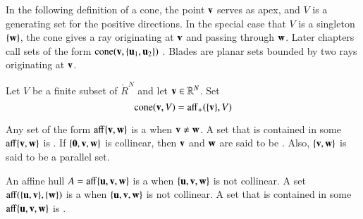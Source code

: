 In the following definition of a cone, the point ${\mathbf v}$ serves as apex,
and $V$ is a generating set for the positive directions.  In the
special case that $V$ is a singleton $\{{\mathbf w}\}$, the cone gives a ray
originating at ${\mathbf v}$ and passing through ${\mathbf w}$.  Later chapters call
sets of the form ${\operatorname{cone}}({\mathbf v},\{{\mathbf u}_1,{\mathbf u}_2\})$ .
Blades are planar sets bounded by two rays originating at ${\mathbf v}$.
%
%
%

\begin{definition}[cone]
Let $V$ be a finite subset of
$\ring{R}^N$ and let ${\mathbf v}\in\mathbb{R}^N$. Set
\[ 
{\operatorname{cone}}({\mathbf v},V) = {\operatorname{aff}}_+(\{{\mathbf v}\},V)
\] 
%
%
\end{definition}




	
\begin{definition}
  Any set of the form ${\operatorname{aff}}\{{\mathbf v},{\mathbf w}\}$ is a  when
  ${\mathbf v}\ne {\mathbf w}$.  A set that is contained in some $\operatorname{aff}\{{\mathbf v},{\mathbf w}\}$ is
  .  If $\{{\mathbf 0},{\mathbf v},{\mathbf w}\}$ is collinear, then
  ${\mathbf v}$ and ${\mathbf w}$ are said to be . Also, $\{{\mathbf v},{\mathbf w}\}$
  is said to be a parallel set.
\end{definition}
%
%

\begin{definition}\label{def:plane}
  An affine hull $A={\operatorname{aff}}\{{\mathbf u},{\mathbf v},{\mathbf w}\}$ is a  when
  $\{{\mathbf u},{\mathbf v},{\mathbf w}\}$ is not collinear.  A set ${\operatorname{aff}}(\{{\mathbf u},{\mathbf v}\},\{{\mathbf w}\})$
  is a  when $\{{\mathbf u},{\mathbf v},{\mathbf w}\}$ is not collinear. A
  set that is contained in some $\operatorname{aff}\{{\mathbf u},{\mathbf v},{\mathbf w}\}$ is .
\end{definition}
%
%
%
%


